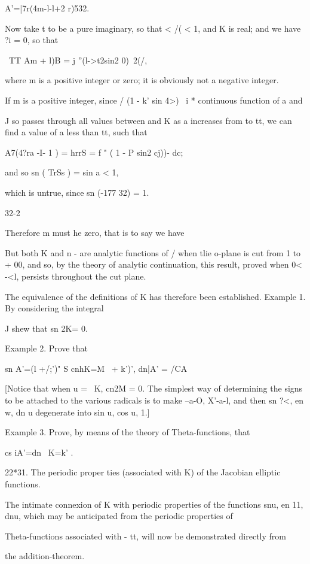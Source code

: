 A'=|7r(4m-l-l+2 r)532.

Now take t to be a pure imaginary, so that < /( < 1, and K is real;
and we have ?i = 0, so that

\ TT Am + l)B = j ''(l->t2sin2 0)~2(/,

where m is a positive integer or zero; it is obviously not a negative
integer.

If m is a positive integer, since / (1 - k' sin 4>)~ i * continuous
function of a and

J so passes through all values between and K as a increases from to
tt, we can find a value of a less than tt, such that

A7(4?ra -I- 1 ) = hrrS = f " ( 1 - P sin2 cj))- dc;

and so sn ( TrSs ) = sin a < 1,

which is untrue, since sn (-177 32) = 1.

32-2

%
%

Therefore m must he zero, that is to say we have

But both K and n - are analytic functions of / when tlie o-plane is
cut from 1 to + 00, and so, by the theory of analytic continuation,
this result, proved when 0< -<l, persists throughout the cut plane.

The equivalence of the definitions of K has therefore been
established. Example 1. By considering the integral

J shew that sn 2K= 0.

Example 2. Prove that

sn A'=(l +/;')" S cnhK=M \ + k')', dn|A' = /CA

[Notice that when u = \ K, cn2M = 0. The simplest way of determining
the signs to be attached to the various radicals is to make --a-O,
X'-a-l, and then sn ?<, en w, dn u degenerate into sin u, cos u, 1.]

Example 3. Prove, by means of the theory of Theta-functions, that

cs iA'=dn \ K=k' .

22*31. The periodic proper ties (associated with K) of the Jacobian
elliptic functions.

The intimate connexion of K with periodic properties of the functions
snu, en 11, dnu, which may be anticipated from the periodic properties
of

Theta-functions associated with - tt, will now be demonstrated
directly from

the addition-theorem.

